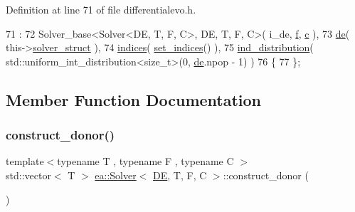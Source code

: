 Definition at line 71 of file differentialevo.\+h.


\begin{DoxyCode}
71                                                           :
72                 Solver\_base<Solver<DE, T, F, C>, DE, T, F, C>( i\_de, \hyperlink{classea_1_1_solver__base_ae0a893780c93dfe17c1d17301de6494f}{f}, \hyperlink{classea_1_1_solver__base_a6914e89d30e7484f2b4af1783f0de8c3}{c} ),
73                 \hyperlink{classea_1_1_solver_3_01_d_e_00_01_t_00_01_f_00_01_c_01_4_a789b8665ce321248e3999907c37d0963}{de}( this->\hyperlink{classea_1_1_solver__base_a5e1d821809f2d26c6f882942ad728127}{solver\_struct} ),
74                 \hyperlink{classea_1_1_solver_3_01_d_e_00_01_t_00_01_f_00_01_c_01_4_a8428ecceaab1c7e26715ed2f72654693}{indices}( \hyperlink{classea_1_1_solver_3_01_d_e_00_01_t_00_01_f_00_01_c_01_4_a86a25b0977865969248efd4e79e4982f}{set\_indices}() ),
75                 \hyperlink{classea_1_1_solver_3_01_d_e_00_01_t_00_01_f_00_01_c_01_4_a2f762378d566944899b2a07a5c74fc7f}{ind\_distribution}( std::uniform\_int\_distribution<size\_t>(0,
      \hyperlink{classea_1_1_solver_3_01_d_e_00_01_t_00_01_f_00_01_c_01_4_a789b8665ce321248e3999907c37d0963}{de}.npop - 1) )
76         \{
77         \};
\end{DoxyCode}


\subsection{Member Function Documentation}
\mbox{\label{classea_1_1_solver_3_01_d_e_00_01_t_00_01_f_00_01_c_01_4_a69dabdddba116ddb5685355119bd77e0}} 
\subsubsection{\texorpdfstring{construct\+\_\+donor()}{construct\_donor()}}
{\footnotesize\ttfamily template$<$typename T , typename F , typename C $>$ \\
std\+::vector$<$ T $>$ \hyperlink{classea_1_1_solver}{ea\+::\+Solver}$<$ \hyperlink{structea_1_1_d_e}{DE}, T, F, C $>$\+::construct\+\_\+donor (\begin{DoxyParamCaption}{ }\end{DoxyParamCaption})\hspace{0.3cm}{\ttfamily [private]}}



